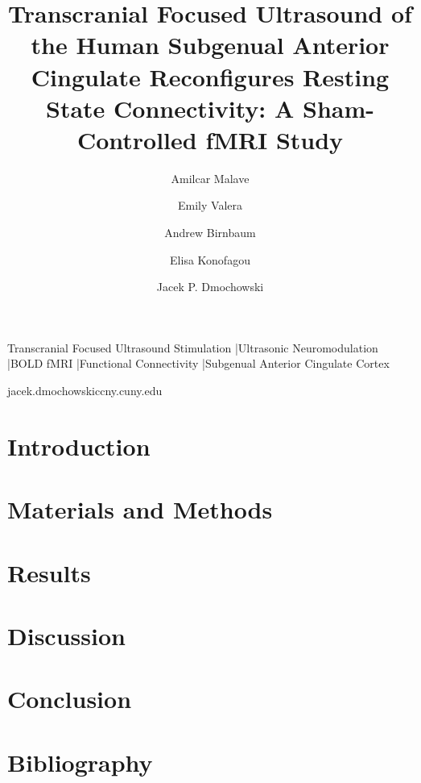 \documentclass[times,twoside]{zHenriquesLab-StyleBioRxiv}
\begin{document}
\title{Transcranial Focused Ultrasound of the Human Subgenual Anterior Cingulate Reconfigures Resting State Connectivity: A Sham-Controlled fMRI Study}

\author[1]{Amilcar Malave}
\author[1]{Emily Valera}
\author[1]{Andrew Birnbaum}
\author[2]{Elisa Konofagou}
\author[1,\Letter]{Jacek P. Dmochowski}


\maketitle

\begin{abstract}

\end{abstract}

\begin{keywords}
Transcranial Focused Ultrasound Stimulation \quad|\quad Ultrasonic Neuromodulation \quad|\quad BOLD fMRI \quad|\quad Functional Connectivity \quad|\quad Subgenual Anterior Cingulate Cortex
\end{keywords}

\begin{corrauthor}
jacek.dmochowski\at ccny.cuny.edu
\end{corrauthor}

\section*{Introduction}


\section*{Materials and Methods}


\section*{Results}


\section*{Discussion}


\section*{Conclusion}


\begin{acknowledgements}

\end{acknowledgements}

\section*{Bibliography}


%
\end{document}
